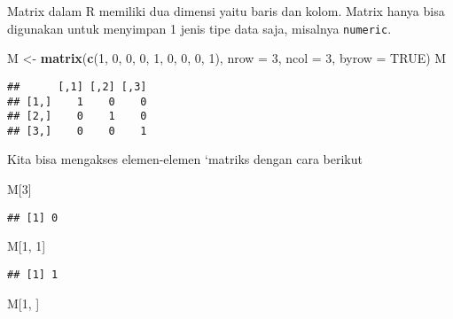 \documentclass[
]{book}
\newenvironment{Shaded}{\begin{snugshade}}{\end{snugshade}}
\newcommand{\DataTypeTok}[1]{\textcolor[rgb]{0.13,0.29,0.53}{#1}}
\newcommand{\DecValTok}[1]{\textcolor[rgb]{0.00,0.00,0.81}{#1}}
\newcommand{\KeywordTok}[1]{\textcolor[rgb]{0.13,0.29,0.53}{\textbf{#1}}}
\newcommand{\NormalTok}[1]{#1}
\newcommand{\OtherTok}[1]{\textcolor[rgb]{0.56,0.35,0.01}{#1}}
\newcommand{\StringTok}[1]{\textcolor[rgb]{0.31,0.60,0.02}{#1}}
\begin{document}
Matrix dalam R memiliki dua dimensi yaitu baris dan kolom. Matrix hanya bisa digunakan untuk menyimpan 1 jenis tipe data saja, misalnya \texttt{numeric}.

\begin{Shaded}
\begin{Highlighting}[]
\NormalTok{M \textless{}{-}}\StringTok{ }\KeywordTok{matrix}\NormalTok{(}\KeywordTok{c}\NormalTok{(}\DecValTok{1}\NormalTok{, }\DecValTok{0}\NormalTok{, }\DecValTok{0}\NormalTok{, }\DecValTok{0}\NormalTok{, }\DecValTok{1}\NormalTok{, }\DecValTok{0}\NormalTok{, }\DecValTok{0}\NormalTok{, }\DecValTok{0}\NormalTok{, }\DecValTok{1}\NormalTok{), }
        \DataTypeTok{nrow =} \DecValTok{3}\NormalTok{, }\DataTypeTok{ncol =} \DecValTok{3}\NormalTok{, }\DataTypeTok{byrow =} \OtherTok{TRUE}\NormalTok{)}
\NormalTok{M}
\end{Highlighting}
\end{Shaded}

\begin{verbatim}
##      [,1] [,2] [,3]
## [1,]    1    0    0
## [2,]    0    1    0
## [3,]    0    0    1
\end{verbatim}

Kita bisa mengakses elemen-elemen `matriks dengan cara berikut

\begin{Shaded}
\begin{Highlighting}[]
\NormalTok{M[}\DecValTok{3}\NormalTok{]}
\end{Highlighting}
\end{Shaded}

\begin{verbatim}
## [1] 0
\end{verbatim}

\begin{Shaded}
\begin{Highlighting}[]
\NormalTok{M[}\DecValTok{1}\NormalTok{, }\DecValTok{1}\NormalTok{]}
\end{Highlighting}
\end{Shaded}

\begin{verbatim}
## [1] 1
\end{verbatim}

\begin{Shaded}
\begin{Highlighting}[]
\NormalTok{M[}\DecValTok{1}\NormalTok{, ]}
\end{Highlighting}
\end{Shaded}
\end{document}
